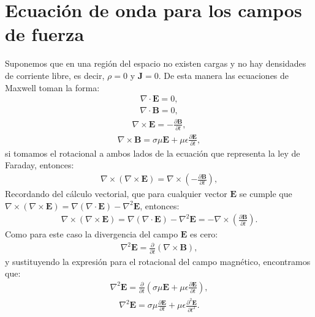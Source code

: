 \documentclass[11pt,fleqn]{book} %
\begin{document}
\section{Ecuaci\'on de onda para los campos de fuerza}
Suponemos que en una regi\'on del espacio no existen cargas y no hay densidades de corriente libre, es decir, $\rho=0$ y $\textbf{J}=0$. De esta manera las ecuaciones de Maxwell toman la forma:
\begin{eqnarray*}
\nabla\cdot\textbf{E}=0,
\end{eqnarray*}
\begin{eqnarray*}
\nabla\cdot\textbf{B}=0,
\end{eqnarray*}
  \begin{eqnarray*}
\nabla\times\textbf{E}=-\frac{\partial \textbf{B}}{\partial t},
\end{eqnarray*}
 \begin{eqnarray*}
\nabla\times\textbf{B}=\sigma\mu\textbf{E}+\mu\epsilon\frac{\partial \textbf{E}}{\partial t},
\end{eqnarray*}
 si tomamos el rotacional a ambos lados de la ecuaci\'on  que representa la ley de Faraday, entonces:
  \begin{eqnarray*}
\nabla\times(\nabla\times\textbf{E})=\nabla\times\left(-\frac{\partial \textbf{B}}{\partial t}\right),
\end{eqnarray*}
 Recordando del c\'alculo vectorial, que para cualquier vector $\textbf{E}$ se cumple que $\nabla\times(\nabla\times\textbf{E})=\nabla(\nabla\cdot\textbf{E})-\nabla^{2}\textbf{E}$, entonces:
  \begin{eqnarray*}
\nabla\times(\nabla\times\textbf{E})=\nabla(\nabla\cdot\textbf{E})-\nabla^{2}\textbf{E}=-\nabla\times\left(\frac{\partial \textbf{B}}{\partial t}\right).
\end{eqnarray*}
Como para este caso la divergencia del campo $\textbf{E}$ es cero:
  \begin{eqnarray*}
\nabla^{2}\textbf{E}=\frac{\partial }{\partial t}(\nabla\times\textbf{B}),
\end{eqnarray*}
 y sustituyendo la expresi\'on para el rotacional del campo magn\'etico, encontramos que:
  \begin{eqnarray*}
\nabla^{2}\textbf{E}=\frac{\partial }{\partial t}\left(\sigma\mu\textbf{E}+\mu\epsilon\frac{\partial \textbf{E}}{\partial t}\right),
\end{eqnarray*}
\begin{eqnarray*}
\nabla^{2}\textbf{E}=\sigma\mu\frac{\partial \textbf{E}}{\partial t}+\mu\epsilon\frac{\partial^{2} \textbf{E}}{\partial t^{2}}.
\end{eqnarray*}
\end{document}
